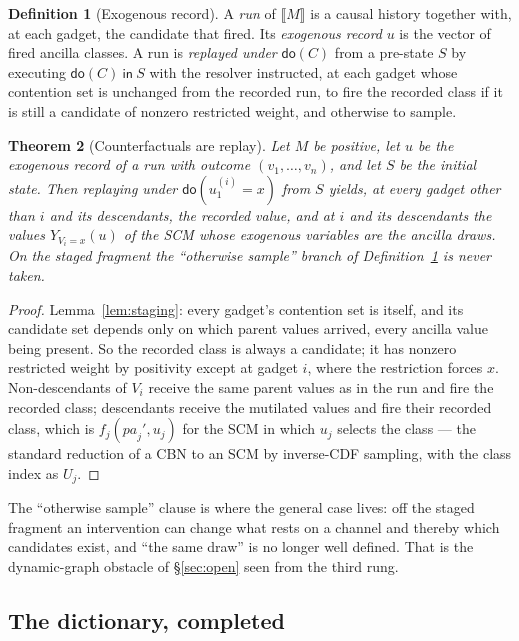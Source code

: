 \documentclass[11pt,a4paper]{article}
\theoremstyle{plain}
\newtheorem{theorem}{Theorem}[section]
\theoremstyle{definition}
\newtheorem{definition}[theorem]{Definition}
\theoremstyle{remark}
\newcommand{\sem}[1]{\llbracket #1 \rrbracket}
\newcommand{\dok}{\textsf{do}}
\newcommand{\ink}{\textsf{in}}
\begin{document}
\begin{definition}[Exogenous record]\label{def:record}
A \emph{run} of $\sem{M}$ is a causal history together with, at each gadget, the
candidate that fired. Its \emph{exogenous record} $u$ is the vector of fired
ancilla classes. A run is \emph{replayed under} $\dok(C)$ from a pre-state $S$
by executing $\dok(C)\ \ink\ S$ with the resolver instructed, at each gadget
whose contention set is unchanged from the recorded run, to fire the recorded
class if it is still a candidate of nonzero restricted weight, and otherwise to
sample.
\end{definition}

\begin{theorem}[Counterfactuals are replay]\label{thm:cf}
Let $M$ be positive, let $u$ be the exogenous record of a run with outcome
$(v_1,\dots,v_n)$, and let $S$ be the initial state. Then replaying under
$\dok(u^{(i)}_1 = x)$ from $S$ yields, at every gadget other than $i$ and its
descendants, the recorded value, and at $i$ and its descendants the values
$Y_{V_i = x}(u)$ of the SCM whose exogenous variables are the ancilla draws.
On the staged fragment the ``otherwise sample'' branch of
Definition~\ref{def:record} is never taken.
\end{theorem}

\begin{proof}
Lemma~\ref{lem:staging}: every gadget's contention set is itself, and its
candidate set depends only on which parent values arrived, every ancilla value
being present. So the recorded class is always a candidate; it has nonzero
restricted weight by positivity except at gadget $i$, where the restriction
forces $x$. Non-descendants of $V_i$ receive the same parent values as in the
run and fire the recorded class; descendants receive the mutilated values and
fire their recorded class, which is $f_j(\mathit{pa}_j', u_j)$ for the SCM in
which $u_j$ selects the class --- the standard reduction of a CBN to an SCM by
inverse-CDF sampling, with the class index as $U_j$.
\end{proof}

The ``otherwise sample'' clause is where the general case lives: off the staged
fragment an intervention can change what rests on a channel and thereby which
candidates exist, and ``the same draw'' is no longer well defined. That is the
dynamic-graph obstacle of \S\ref{sec:open} seen from the third rung.

\subsection{The dictionary, completed}
\end{document}
